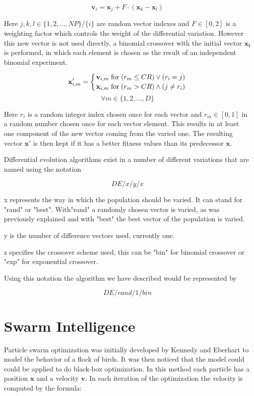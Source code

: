 \documentclass[a4paper,titlepage]{report}
\begin{document}
\[ \mathbf{v}_{i} = \mathbf{x}_{j} + F \cdot ( \mathbf{x}_{k} -  \mathbf{x}_{l} ) \]

Here $j,k,l \in \{1,2,\dots,NP\} / \{i\}$ are random vector indexes and $F \in [0,2]$ is a weighting factor which controls the weight of the differential variation. However this new vector is not used directly, a binomial crossover with the initial vector $\mathbf{x_i}$ is performed, in which each element is chosen as the result of an independent binomial experiment.

\newcommand*{\bfrac}[2]{\genfrac{}{}{0pt}{}{#1}{#2}}

\[ \mathbf{x}'_{i,m} = \left\{ \bfrac{ \mathbf{v}_{i,m} \; \text{for}\; (r_m \le CR) \lor (r_i = j) }{ \mathbf{x}_{i,m} \;\text{for}\; (r_m > CR) \land (j \ne r_i) } \right. \]
\[ \forall m \in \{1,2,\dots,D\} \]

Here $r_i$ is a random integer index chosen once for each vector and $r_m \in [0,1]$ in a random number chosen once for each vector element. This results in at least one component of the new vector coming from the varied one. The resulting vector $\mathbf{x}'$ is then kept if it has a better fitness values than its predecessor $\mathbf{x}$.

Differential evolution algorithms exist in a number of different variations that are named using the notation

\[DE/x/y/x\]

x represents the way in which the population should be varied. It can stand for "rand" or "best". With"rand" a randomly chosen vector is varied, as was previously explained and with "best" the best vector of the population is varied.

y is the number of difference vectors used, currently one.

z specifies the crossover scheme used, this can be "bin" for binomial crossover or "exp" for exponential crossover.

Using this notation the algorithm we have described would be represented by

\[DE/rand/1/bin\]



\section{Swarm Intelligence}

Particle swarm optimization was initially developed by Kennedy and Eberhart to model the behavior of a flock of birds. It was then noticed that the model could could be applied to do black-box optimization. In this method each particle has a position $\mathbf{x}$ and a velocity $\mathbf{v}$. In each iteration of the optimization the velocity is computed by the formula:
\end{document}
